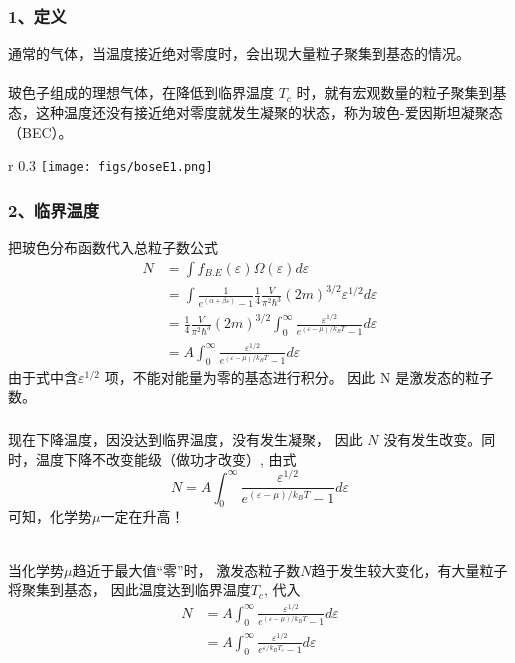 \begin{frame}
  \frametitle{ 1、定义 }
  通常的气体，当温度接近绝对零度时，会出现大量粒子聚集到基态的情况。\\
  ~~\\ 
  玻色子组成的理想气体，在降低到临界温度 $T_c$ 时，就有宏观数量的粒子聚集到基态，这种温度还没有接近绝对零度就发生凝聚的状态，称为玻色-爱因斯坦凝聚态（BEC）。
  \begin{wrapfigure} {r} {0.3\textwidth} %
    \texttt{[image: figs/boseE1.png]}   
\end{wrapfigure}
\end{frame} 

\begin{frame}
  \frametitle{ 2、临界温度}
  把玻色分布函数代入总粒子数公式
  \[ 
    \begin{aligned}
      N &=\int f_{B.E}(\varepsilon) \Omega (\varepsilon) d \varepsilon \\ 
      &= \int  \frac{1}{e^{(\alpha +\beta \varepsilon)}-1} \frac{1}{4} \frac{V}{\pi ^2 \hbar^3} (2m)^{3/2} \varepsilon^{1/2} d \varepsilon   \\
      &= \frac{1}{4} \frac{V}{\pi ^2 \hbar^3} (2m)^{3/2} \int_0^\infty \frac{\varepsilon^{1/2}}{e^{(\varepsilon - \mu) /k_B T }-1} d \varepsilon \\
      &= A \int_0^\infty \frac{\varepsilon^{1/2}}{e^{(\varepsilon - \mu) /k_B T }-1} d \varepsilon 
    \end{aligned}
     \]
     由于式中含$ \varepsilon^{1/2} $ 项，不能对能量为零的基态进行积分。 因此 N 是激发态的粒子数。
\end{frame} 

\begin{frame}
  \frametitle{}
  现在下降温度，因没达到临界温度，没有发生凝聚， 因此 $N$ 没有发生改变。同时，温度下降不改变能级（做功才改变）, 由式
  \[N = A \int_0^\infty \frac{\varepsilon^{1/2}}{e^{(\varepsilon - \mu) /k_B T }-1} d \varepsilon \]
  可知，化学势$\mu$一定在升高！

  ~~\\ 
  当化学势$\mu$趋近于最大值“零”时， 激发态粒子数$N$趋于发生较大变化，有大量粒子将聚集到基态， 因此温度达到临界温度$T_c$, 代入  
  \[\begin{aligned}
    N &= A \int_0^\infty \frac{\varepsilon^{1/2}}{e^{(\varepsilon - \mu) /k_B T }-1} d \varepsilon  \\
    &=  A \int_0^\infty \frac{\varepsilon^{1/2}}{e^{\varepsilon /k_B T_c }-1} d \varepsilon \\
  \end{aligned}\]
\end{frame} 


